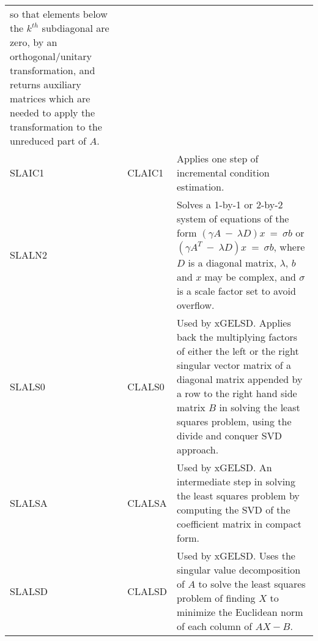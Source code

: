 \begin{center}
\begin{tabular}{| l   p{0.75in} |p{4.5in}    |}
so that elements below the $k^{th}$ subdiagonal are zero,
by an orthogonal/unitary transformation,
and returns auxiliary matrices 
which are needed to apply the transformation to the unreduced part of $A$.\\
SLAIC1&CLAIC1&
Applies one step of incremental condition estimation.\\
SLALN2&&
Solves a 1-by-1 or 2-by-2 system of equations of the form  
$(\gamma A~-~\lambda D ) x~=~\sigma b$
or $(\gamma A^T~-~\lambda D) x~=~\sigma b$,
where $D$ is a diagonal matrix,
$\lambda$, $b$ and $x$ may be complex, 
and $\sigma$ is a scale factor set to avoid overflow.\\
SLALS0&CLALS0&
Used by xGELSD.
Applies back the multiplying factors of either the left or the right
singular vector matrix of a diagonal matrix appended by a row to
the right hand side matrix $B$ in solving the least squares problem,
using the divide and conquer SVD approach.\\
SLALSA&CLALSA&
Used by xGELSD.
An intermediate step in solving the least squares problem
by computing the SVD of the coefficient matrix in compact form. \\
SLALSD&CLALSD&
Used by xGELSD.
Uses the singular value decomposition of $A$ to solve the least
squares problem of finding $X$ to minimize the Euclidean norm of each
column of $A  X - B$. \\
\hline
\end{tabular}
\end{center}
